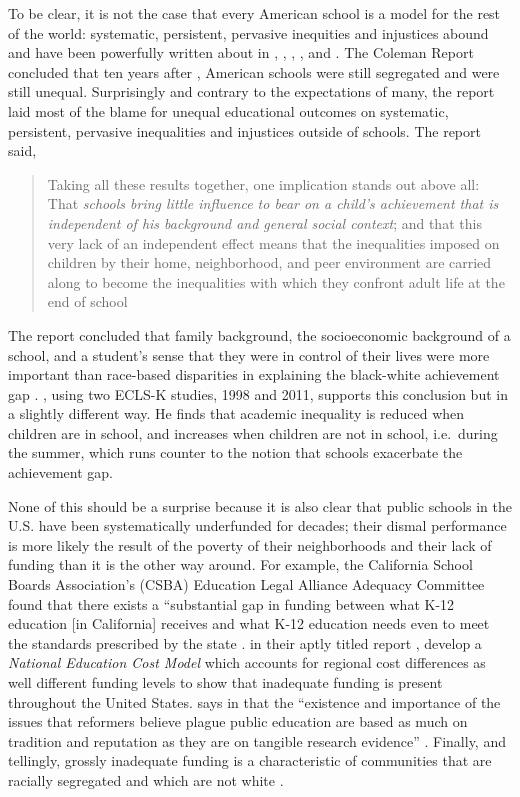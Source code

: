 To be clear, it is not the case that every American school is a model for the
rest of the world: systematic, persistent, pervasive inequities and injustices
abound and have been powerfully written about in \textcite{Kozol1992}, \textcite{Valenzuela1999}, \textcite{Kozol2005}, \textcite{Heitzeg2009}, and \textcite{Roithmayr2021}. The Coleman Report \parencite{Coleman1966} concluded that ten years after , American schools were still segregated and were still unequal. Surprisingly and contrary to the expectations of many, the report laid most of the blame for unequal educational outcomes on systematic, persistent, pervasive inequalities and injustices outside of schools. The report said,
\blockquote[{\parencite[325]{Coleman1966}}][.]{\SingleSpacing\vspace{-0.5\baselineskip}%
  Taking all these results together, one implication stands out above all: That \textit{schools bring little influence to bear on a child's achievement that is independent of his background and general social context}; and that this very lack of an independent effect means that the inequalities imposed on children by their home, neighborhood, and peer environment are carried along to become the inequalities with which they confront adult life at the end of school}
The report concluded that family background, the socioeconomic background of a school, and a student's sense that they were in control of their lives were more important than race-based disparities in explaining the black-white achievement gap \parencite{Pearce2016}. \textcite{Downey2020}, using two ECLS-K studies, 1998 and 2011, supports this conclusion but in a slightly different way. He finds that academic inequality is reduced when children are in school, and increases when children are not in school, i.e.~during the summer, which runs counter to the notion that schools exacerbate the achievement gap.

None of this should be a surprise because it is also clear that public schools in the U.S. have been systematically underfunded for decades; their dismal performance is more likely the result of the poverty of their neighborhoods and their lack of funding than it is the other way around. For example, the California School Boards Association's (CSBA) Education Legal Alliance Adequacy Committee found that there exists a ``substantial gap in funding between what K-12 education [in California] receives and what K-12 education needs even to meet the standards prescribed by the state \parencite[\textit{iii}]{Bray2015}. \textcite{Baker.etal2018} in their aptly titled report , develop a \textit{National Education Cost Model} \parencite%
{Baker.etal2018} which accounts for regional cost differences as well different funding levels to show that inadequate funding is present throughout the United States. \textcite{Garcia2018} says in  that the ``existence and importance of the issues that reformers believe plague public education are based as much on tradition and reputation as they are on tangible research evidence'' \parencite[54]{Garcia2018}. Finally, and tellingly, grossly inadequate funding is a characteristic of communities that are racially segregated and which are not white \parencite{Darling-Hammond2012, Rothstein2017}.

